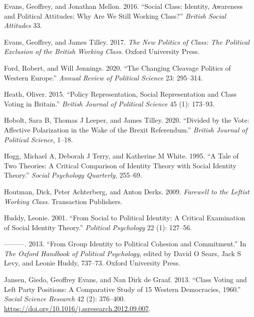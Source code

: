 \documentclass[a4paper]{cupjournal}
\newenvironment{CSLReferences}%
  {}%
  {\par}
\begin{document}
\begin{CSLReferences}{1}{0}
\leavevmode{}%
Evans, Geoffrey, and Jonathan Mellon. 2016. {``Social Class: {Identity}, Awareness and Political Attitudes: {Why} Are We Still Working Class?''} \emph{British Social Attitudes} 33.

\leavevmode{}%
Evans, Geoffrey, and James Tilley. 2017. \emph{The New Politics of Class: {The} Political Exclusion of the {British} Working Class}. {Oxford University Press}.

\leavevmode{}%
Ford, Robert, and Will Jennings. 2020. {``The Changing Cleavage Politics of {Western Europe}.''} \emph{Annual Review of Political Science} 23: 295--314.

\leavevmode{}%
Heath, Oliver. 2015. {``Policy Representation, Social Representation and Class Voting in {Britain}.''} \emph{British Journal of Political Science} 45 (1): 173--93.

\leavevmode{}%
Hobolt, Sara B, Thomas J Leeper, and James Tilley. 2020. {``Divided by the Vote: {Affective} Polarization in the Wake of the {Brexit} Referendum.''} \emph{British Journal of Political Science}, 1--18.

\leavevmode{}%
Hogg, Michael A, Deborah J Terry, and Katherine M White. 1995. {``A Tale of Two Theories: {A} Critical Comparison of Identity Theory with Social Identity Theory.''} \emph{Social Psychology Quarterly}, 255--69.

\leavevmode{}%
Houtman, Dick, Peter Achterberg, and Anton Derks. 2009. \emph{Farewell to the {Leftist Working Class}}. {Transaction Publishers}.

\leavevmode{}%
Huddy, Leonie. 2001. {``From Social to Political Identity: {A} Critical Examination of Social Identity Theory.''} \emph{Political Psychology} 22 (1): 127--56.

\leavevmode{}%
---------. 2013. {``From Group Identity to Political Cohesion and Commitment.''} In \emph{The {Oxford} Handbook of Political Psychology}, edited by David O Sears, Jack S Levy, and Leonie Huddy, 737--73. {Oxford University Press}.

\leavevmode{}%
Jansen, Giedo, Geoffrey Evans, and Nan Dirk de Graaf. 2013. {``Class Voting and {Left} Party Positions: {A} Comparative Study of 15 {Western} Democracies, 1960.''} \emph{Social Science Research} 42 (2): 376--400. \url{https://doi.org/10.1016/j.ssresearch.2012.09.007}.


\end{CSLReferences}
\end{document}
